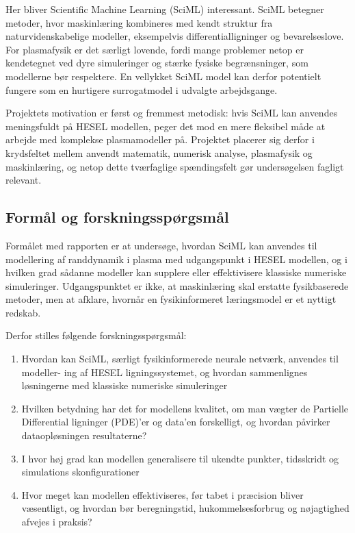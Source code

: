 Her bliver Scientific Machine Learning (SciML) interessant. SciML betegner metoder, hvor maskinlæring kombineres med kendt struktur fra naturvidenskabelige modeller, eksempelvis differentialligninger og bevarelseslove.
For plasmafysik er det særligt lovende, fordi mange problemer netop er kendetegnet ved dyre simuleringer og stærke fysiske begrænsninger, som modellerne bør respektere.
En vellykket SciML model kan derfor potentielt fungere som en hurtigere surrogatmodel i udvalgte arbejdsgange.

Projektets motivation er først og fremmest metodisk: hvis SciML kan anvendes meningsfuldt på HESEL modellen,
peger det mod en mere fleksibel måde at arbejde med komplekse plasmamodeller på.
Projektet placerer sig derfor i krydsfeltet mellem anvendt matematik, numerisk analyse, plasmafysik og maskinlæring, og netop dette tværfaglige spændingsfelt gør undersøgelsen fagligt relevant.

\subsection{Formål og forskningsspørgsmål}

Formålet med rapporten er at undersøge, hvordan SciML kan anvendes til modellering af randdynamik i plasma med udgangspunkt i HESEL modellen,
og i hvilken grad sådanne modeller kan supplere eller effektivisere klassiske numeriske simuleringer.
Udgangspunktet er ikke, at maskinlæring skal erstatte fysikbaserede metoder, men at afklare, hvornår en fysikinformeret læringsmodel er et nyttigt redskab.

Derfor stilles følgende forskningsspørgsmål:
\begin{enumerate}
    \item Hvordan kan SciML, særligt fysikinformerede neurale netværk, anvendes til modeller- ing af HESEL ligningssystemet, og hvordan sammenlignes løsningerne med klassiske numeriske simuleringer
    \item Hvilken betydning har det for modellens kvalitet, om man vægter de Partielle Differential ligninger (PDE)'er og data'en forskelligt, og hvordan påvirker dataopløsningen resultaterne? 
    \item I hvor høj grad kan modellen generalisere til ukendte punkter, tidsskridt og simulations skonfigurationer 
    \item Hvor meget kan modellen effektiviseres, før tabet i præcision bliver væsentligt, og hvordan bør beregningstid, hukommelsesforbrug og nøjagtighed afvejes i praksis?
\end{enumerate}

